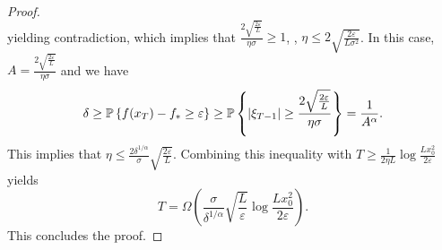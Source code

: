 \documentclass{article} %
\numberwithin{equation}{section}
\begin{document}
\begin{proof}
\begin{equation}
    \end{equation}
    yielding contradiction, which implies that $\frac{2\sqrt{\frac{2\varepsilon}{L}}}{\eta \sigma} \geq 1$, \ie, $\eta \leq 2\sqrt{\frac{2\varepsilon}{L\sigma^2}}$. 
    In this case, $A=\frac{2\sqrt{\frac{2\varepsilon}{L}}}{\eta \sigma}$ and we have 
    \begin{equation}
         \delta \geq \mathbb{P}\left\{f(x_T)-f_* \geq \varepsilon\right\} \geq \mathbb{P}\left\{\left|\xi_{T-1}\right| \geq \frac{2\sqrt{\frac{2\varepsilon}{L}}}{\eta \sigma} \right\} = \frac{1}{A^\alpha}.
    \end{equation}
    This implies that $\eta \leq \frac{2\delta^{1/\alpha}}{\sigma}\sqrt{\frac{2\varepsilon}{L}}$. 
    Combining this inequality with $T \geq \frac{1}{2\eta L} \log\frac{L x_0^2}{2\varepsilon}$ yields
    \begin{equation}
        T = \Omega \left(\frac{\sigma}{\delta^{1/\alpha}}\sqrt{\frac{L}{\varepsilon}}\log\frac{L x_0^2}{2\varepsilon}\right).
    \end{equation}
    This concludes the proof.
\end{proof}
\end{document}
